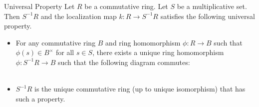 \documentclass[a4paper]{article}
\begin{document}
\begin{prp}{Universal Property}{} Let $R$ be a commutative ring. Let $S$ be a multiplicative set. Then $S^{-1}R$ and the localization map $k:R\to S^{-1}R$ satisfies the following universal property. 
\begin{itemize}
\item For any commutative ring $B$ and ring homomorphism $\phi:R\to B$ such that $\phi(s)\in B^\times$ for all $s\in S$, there exists a unique ring homomorphism $\phi:S^{-1}R\to B$ such that the following diagram commutes: \\
 \\
\item $S^{-1}R$ is the unique commutative ring (up to unique isomorphism) that has such a property. 
\end{itemize}
\end{prp}
\end{document}
